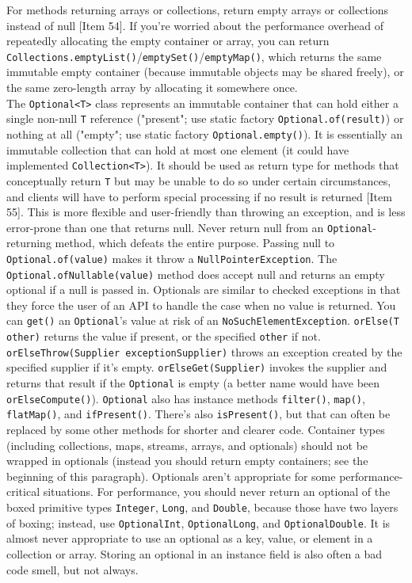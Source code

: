 \documentclass[8pt, table, xcdraw]{article}%
\begin{document}
For methods returning arrays or collections, return empty arrays or collections instead of null [Item 54]. If you're worried about the performance overhead of repeatedly allocating the empty container or array, you can return \lstinline{Collections.emptyList()}/\lstinline{emptySet()}/\lstinline{emptyMap()}, which returns the same immutable empty container (because immutable objects may be shared freely), or the same zero-length array by allocating it somewhere once.\\
The \lstinline{Optional<T>} class represents an immutable container that can hold either a single non-null \lstinline{T} reference ("present"; use static factory \lstinline{Optional.of(result)}) or nothing at all ("empty"; use static factory \lstinline{Optional.empty()}). It is essentially an immutable collection that can hold at most one element (it could have implemented \lstinline{Collection<T>}). It should be used as return type for methods that conceptually return \lstinline{T} but may be unable to do so under certain circumstances, and clients will have to perform special processing if no result is returned [Item 55]. This is more flexible and user-friendly than throwing an exception, and is less error-prone than one that returns null. Never return null from an \lstinline{Optional}-returning method, which defeats the entire purpose. Passing null to \lstinline{Optional.of(value)} makes it throw a \lstinline{NullPointerException}. The \lstinline{Optional.ofNullable(value)} method does accept null and returns an empty optional if a null is passed in. Optionals are similar to checked exceptions in that they force the user of an API to handle the case when no value is returned. You can \lstinline{get()} an \lstinline{Optional}'s value at risk of an \lstinline{NoSuchElementException}. \lstinline{orElse(T other)} returns the value if present, or the specified \lstinline{other} if not. \lstinline{orElseThrow(Supplier exceptionSupplier)} throws an exception created by the specified supplier if it's empty. \lstinline{orElseGet(Supplier)} invokes the supplier and returns that result if the \lstinline{Optional} is empty (a better name would have been \lstinline{orElseCompute()}). \lstinline{Optional} also has instance methods \lstinline{filter()}, \lstinline{map()}, \lstinline{flatMap()}, and \lstinline{ifPresent()}. There's also \lstinline{isPresent()}, but that can often be replaced by some other methods for shorter and clearer code. Container types (including collections, maps, streams, arrays, and optionals) should not be wrapped in optionals (instead you should return empty containers; see the beginning of this paragraph). Optionals aren't appropriate for some performance-critical situations. For performance, you should never return an optional of the boxed primitive types \lstinline{Integer}, \lstinline{Long}, and \lstinline{Double}, because those have two layers of boxing; instead, use \lstinline{OptionalInt}, \lstinline{OptionalLong}, and \lstinline{OptionalDouble}. It is almost never appropriate to use an optional as a key, value, or element in a collection or array. Storing an optional in an instance field is also often a bad code smell, but not always.
\end{document}
